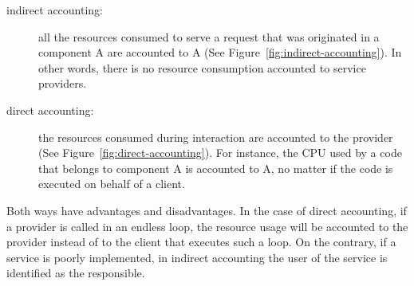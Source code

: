 \begin{description}

\item[indirect accounting:] all the resources consumed to serve a request that was originated in a component A are accounted to A (See Figure~\ref{fig:indirect-accounting}).
In other words, there is no resource consumption accounted to service providers.

\item[direct accounting:] the resources consumed during
interaction are accounted to the provider (See Figure~\ref{fig:direct-accounting}).
For instance, the CPU used by a code that belongs
to component A is accounted to A, no matter if the code is executed on behalf of a client.
\end{description}

Both ways have advantages and disadvantages.
In the case of direct accounting, if a provider is
called in an endless loop, the resource usage will be accounted
to the provider instead of to the client that executes such a loop.
On the contrary, if a service is poorly implemented, in indirect accounting the user of the service is identified as the responsible.

